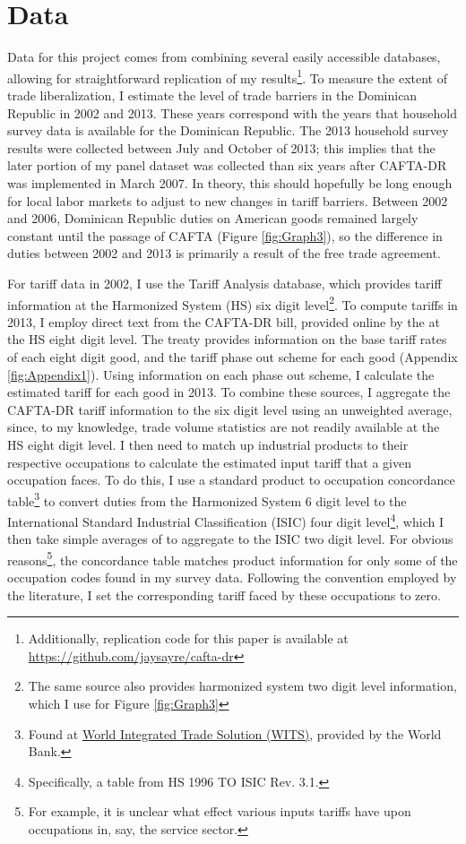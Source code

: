\documentclass[12pt]{article}
\begin{document}
\section{Data}
\label{sec:Data}
Data for this project comes from combining several easily accessible databases, allowing
for straightforward replication of my results\footnote{Additionally, replication code for this 
paper is available at \url{https://github.com/jaysayre/cafta-dr}}.
To measure the extent of trade liberalization, I estimate the level of trade barriers in the
Dominican Republic in 2002 and 2013. These years correspond with the years that household
survey data is available for the Dominican Republic. The 2013 household survey results were collected 
between July and October of 2013; this implies
that the later portion of my panel dataset was collected than six years after CAFTA-DR was implemented 
in March 2007. In theory, this should hopefully be long enough for local labor markets to adjust 
to new changes in tariff barriers.
Between 2002 and 2006, Dominican Republic duties on American goods 
remained largely constant until the passage of CAFTA (Figure \ref{fig:Graph3}), so the 
difference in duties between 2002 and 2013 is primarily a result of the free trade agreement.

For tariff data in 2002, 
I use the \citet{wtotariff} Tariff Analysis database, which provides tariff information 
at the Harmonized System (HS) six digit level\footnote{The same source
also provides harmonized system two digit level information,
which I use for Figure \ref{fig:Graph3}}. To compute tariffs in 2013, 
I employ direct text from the CAFTA-DR bill, provided online by the 
\citet{ustraderep} at the HS eight digit level. The treaty provides
information on the base tariff rates of each eight digit good, and the tariff phase out
scheme for each good (Appendix \ref{fig:Appendix1}).
Using information on each phase out scheme, I calculate the estimated tariff
for each good in 2013. To combine these sources, I aggregate
the CAFTA-DR tariff information to the six digit level using an unweighted average, 
since, to my knowledge, trade volume statistics are not readily available at the HS eight digit level.
I then need to match up industrial products to their respective occupations to calculate
the estimated input tariff that a given occupation faces. 
To do this, I use a standard product to occupation concordance table\footnote{Found at 
\href{http://wits.worldbank.org/product_concordance.html}{World Integrated Trade Solution (WITS)}, 
provided by the World Bank.} to convert duties from the Harmonized System 6 digit level to the 
International Standard Industrial Classification (ISIC) four digit 
level\footnote{Specifically, a table from HS 1996 TO ISIC Rev. 3.1.}, which I then take 
simple averages of to aggregate to the ISIC two digit level.
For obvious reasons\footnote{For example, it is unclear what effect various inputs tariffs have
upon occupations in, say, the service sector.}, the concordance table matches product information
for only some of the occupation codes found in my survey data. Following the convention employed 
by the literature, I set the corresponding tariff faced by these occupations to zero.
\end{document}

